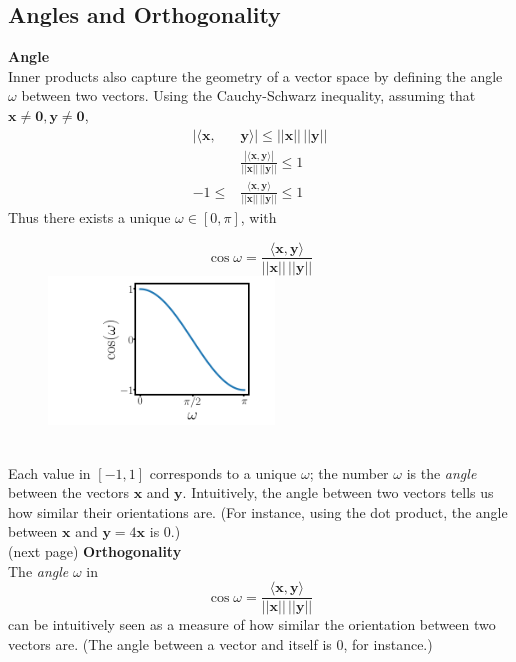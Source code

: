 \documentclass{report}
\begin{document}
\subsection{Angles and Orthogonality} %
\textbf{Angle}\\
Inner products also capture the geometry of a vector space by defining the angle $\omega$ between 
two vectors. Using the Cauchy-Schwarz inequality, assuming that $\bm{x}\neq\bm{0},\bm{y}\neq\bm{0}$,
\begin{align*}
|\langle\bm{x},&\bm{y}\rangle|\leq||\bm{x}||\,||\bm{y}||\\
&\frac{|\langle\bm{x},\bm{y}\rangle|}{||\bm{x}||\,||\bm{y}||}\leq1\\
-1\leq&\frac{\langle\bm{x},\bm{y}\rangle}{||\bm{x}||\,||\bm{y}||}\leq1
\end{align*}
Thus there exists a unique $\omega\in[0,\pi]$, with
\begin{figure}[h]
\begin{equation*}
\cos\omega=\frac{\langle\bm{x},\bm{y}\rangle}{||\bm{x}||\,||\bm{y}||}
\end{equation*}
\includegraphics[width=6cm]{7}\\
\centering
\end{figure}\\
Each value in $[-1,1]$ corresponds to a unique $\omega$; the number $\omega$ is the \textit{angle} 
between the vectors $\bm{x}$ and $\bm{y}$. Intuitively, 
the angle between two vectors tells us how similar their orientations are. 
(For instance, using the dot product, the angle between $\bm{x}$ and $\bm{y}=4\bm{x}$ is 0.)\\
(next page)
\newpage
\noindent\textbf{Orthogonality}\\
The \textit{angle} $\omega$ in
\begin{equation*}
\cos\omega=\frac{\langle\bm{x},\bm{y}\rangle}{||\bm{x}||\,||\bm{y}||}
\end{equation*}
can be intuitively seen as a measure of how similar the orientation between two vectors are.
(The angle between a vector and itself is 0, for instance.)\\
\end{document}
